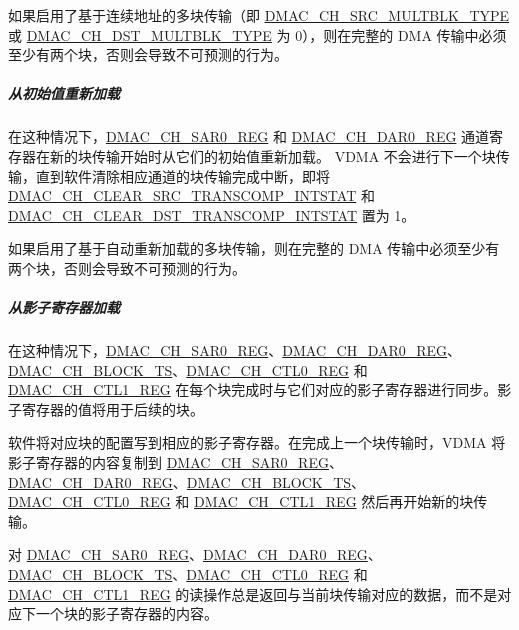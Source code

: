 \documentclass[main\_\_CN.tex]{subfiles}
\begin{document}
\begin{tiplisting}
如果启用了基于连续地址的多块传输（即 \hyperref[fielddesc:DMACCHNSRCMULTBLKTYPE]{DMAC\_CH\_SRC\_MULTBLK\_TYPE} 或 \hyperref[fielddesc:DMACCHNDSTMULTBLKTYPE]{DMAC\_CH\_DST\_MULTBLK\_TYPE} 为 0），则在完整的 DMA 传输中必须至少有两个块，否则会导致不可预测的行为。

\end{tiplisting}

\subparagraph{从初始值重新加载}

在这种情况下，\hyperref[regdesc:DMACCHNSAR0REG]{DMAC\_CH\_SAR0\_REG} 和 \hyperref[regdesc:DMACCHNDAR0REG]{DMAC\_CH\_DAR0\_REG} 通道寄存器在新的块传输开始时从它们的初始值重新加载。
VDMA 不会进行下一个块传输，直到软件清除相应通道的块传输完成中断，即将 \hyperref[fielddesc:DMACCHNCLEARSRCTRANSCOMPINTSTAT]{DMAC\_CH\_CLEAR\_SRC\_TRANSCOMP\_INTSTAT} 和 \hyperref[fielddesc:DMACCHNCLEARDSTTRANSCOMPINTSTAT]{DMAC\_CH\_CLEAR\_DST\_TRANSCOMP\_INTSTAT} 置为 1。

\begin{tiplisting}
    如果启用了基于自动重新加载的多块传输，则在完整的 DMA 传输中必须至少有两个块，否则会导致不可预测的行为。
\end{tiplisting}

\subparagraph{从影子寄存器加载}

在这种情况下，\hyperref[regdesc:DMACCHNSAR0REG]{DMAC\_CH\_SAR0\_REG}、\hyperref[regdesc:DMACCHNDAR0REG]{DMAC\_CH\_DAR0\_REG}、\hyperref[fielddesc:DMACCHNBLOCKTS]{DMAC\_CH\_BLOCK\_TS}、\hyperref[regdesc:DMACCHNCTL0REG]{DMAC\_CH\_CTL0\_REG} 和 \hyperref[regdesc:DMACCHNCTL1REG]{DMAC\_CH\_CTL1\_REG} 在每个块完成时与它们对应的影子寄存器进行同步。影子寄存器的值将用于后续的块。

软件将对应块的配置写到相应的影子寄存器。在完成上一个块传输时，VDMA 将影子寄存器的内容复制到 \hyperref[regdesc:DMACCHNSAR0REG]{DMAC\_CH\_SAR0\_REG}、\hyperref[regdesc:DMACCHNDAR0REG]{DMAC\_CH\_DAR0\_REG}、\hyperref[fielddesc:DMACCHNBLOCKTS]{DMAC\_CH\_BLOCK\_TS}、\hyperref[regdesc:DMACCHNCTL0REG]{DMAC\_CH\_CTL0\_REG} 和 \hyperref[regdesc:DMACCHNCTL1REG]{DMAC\_CH\_CTL1\_REG} 然后再开始新的块传输。

对 \hyperref[regdesc:DMACCHNSAR0REG]{DMAC\_CH\_SAR0\_REG}、\hyperref[regdesc:DMACCHNDAR0REG]{DMAC\_CH\_DAR0\_REG}、\hyperref[fielddesc:DMACCHNBLOCKTS]{DMAC\_CH\_BLOCK\_TS}、\hyperref[regdesc:DMACCHNCTL0REG]{DMAC\_CH\_CTL0\_REG} 和 \hyperref[regdesc:DMACCHNCTL1REG]{DMAC\_CH\_CTL1\_REG} 的读操作总是返回与当前块传输对应的数据，而不是对应下一个块的影子寄存器的内容。
\end{document}
